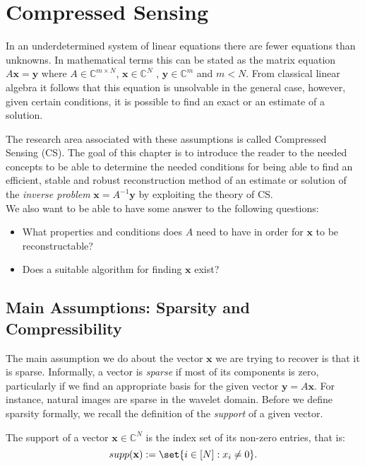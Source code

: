 \chapter{Compressed Sensing}






In an underdetermined system of linear equations there are fewer equations than unknowns. In mathematical terms this can be stated as the matrix equation $A\mathbf{x=y}$ where $A\in \mathbb{C}^{m \times N}$, $\mathbf{x} \in \mathbb{C}^{N}$ , $\mathbf{y} \in \mathbb{C}^{m}$ and $m < N $.  From classical linear algebra it follows that this equation is unsolvable in the general case, however, given certain conditions, it is possible to find an exact or an estimate of a solution. 

The research area associated with these assumptions is called Compressed Sensing (CS). The goal of this chapter is to introduce the reader to the needed concepts to be able to determine the needed conditions for being able to find an efficient, stable and robust reconstruction method of an estimate or solution of the \emph{inverse problem} $\mathbf{x}=A^{-1}\mathbf{y}$ by exploiting the theory of CS. 
\\We also want to be able to have some answer to the following questions:
\begin{itemize}
  \item What properties and conditions does $A$ need to have in order for $\mathbf{x}$ to be reconstructable?
  \item Does a suitable algorithm for finding $\mathbf{x}$ exist?
\end{itemize}



\section{Main Assumptions: Sparsity and Compressibility}

The main assumption we do about the vector $\mathbf{x}$ we are trying to recover is that it is sparse. Informally, a vector is \emph{sparse} if most of its components is zero, particularly if we find an appropriate basis for the given vector $\mathbf{y}=A\mathbf{x}$. For instance, natural images are sparse in the wavelet domain. 
Before we define sparsity formally, we recall the definition of the \emph{support} of a given vector. 

\begin{tcolorbox}[colback=blue,colframe=white]
\begin{definition} The support of a vector $\mathbf{x}	 \in \mathbb{C}^{N}$ is the index set of its non-zero entries, that is: 
$$supp(\mathbf{x}):=\set{i \in [N]: x_{i} \neq 0}.$$
	
	
\end{definition}	
\end{tcolorbox}



